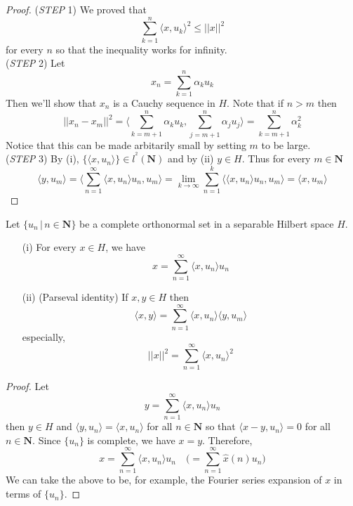 \vspace{2ex}
\begin{proof}
({\it STEP} 1) We proved that
\[\sum ^{n}_{k=1}\langle x,u_{k}\rangle ^2\leq ||x||^2\]
for every $n$ so that the inequality works for infinity.
\\\newline
({\it STEP} 2) Let 
\[x_{n}=\sum ^{n}_{k=1}\alpha _{k}u_{k}\]
Then we'll show that $x_{n}$ is a Cauchy sequence in $H$. Note that if $n>m$ then 
\[||x_{n}-x_{m}||^2=\langle \sum ^{n}_{k=m+1}\alpha _{k}u_{k},\sum _{j=m+1}^{n}\alpha _{j}u_{j}\rangle =\sum ^{n}_{k=m+1}\alpha _{k}^2\]
Notice that this can be made arbitarily small by setting $m$ to be large. 
\\\newline
({\it STEP} 3) By (i), $\{\langle x,u_{n}\rangle \}\in l^{^2}({\bm N})$ and by (ii) $y\in H$. Thus for every $m\in {\bm N}$
\[\langle y,u_{m}\rangle =\langle \sum ^{\infty }_{n=1}\langle x,u_{n}\rangle u_{n},u_{m}\rangle =\lim _{k\rightarrow \infty }\sum ^{k}_{n=1}\langle \langle x,u_{n}\rangle u_{n},u_{m}\rangle =\langle x,u_{m}\rangle  \]
\end{proof}
\vspace{2ex}
\begin{thm}
Let $\{u_{n} \,|\, n\in {\bm N}\}$ be a complete orthonormal set in a separable Hilbert space $H$.
\begin{itemize}
\item[(i)] For every $x\in H$, we have 
\[x=\sum ^{\infty }_{n=1}\langle x,u_{n}\rangle u_{n}\]
\item[(ii)] (Parseval identity) If $x,y\in H$ then 
\[\langle x,y\rangle =\sum ^{\infty }_{n=1}\langle x,u_{n}\rangle \langle y,u_{m}\rangle \]
especially,
\[||x||^2=\sum ^{\infty }_{n=1}\langle x,u_{n}\rangle ^2\]
\end{itemize}
\end{thm}
\vspace{2ex}
\begin{proof}
Let 
\[y=\sum ^{\infty }_{n=1}\langle x,u_{n}\rangle u_{n}\]
then $y\in H$ and $\langle y,u_{n}\rangle =\langle x,u_{n}\rangle $ for all $n\in {\bm N}$ so that $\langle x-y,u_{n}\rangle =0$ for all $n\in {\bm N}$. Since $\{u_{n}\}$ is complete, we have $x=y$. Therefore,
\[x=\sum ^{\infty }_{n=1}\langle x,u_{n}\rangle u_{n}\quad \Big(=\sum ^{\infty }_{n=1}\hat{x}(n)u_{n}\Big)\]
We can take the above to be, for example, the Fourier series expansion of $x$ in terms of $\{u_{n}\}$. 
\end{proof}
\vspace{2ex}
